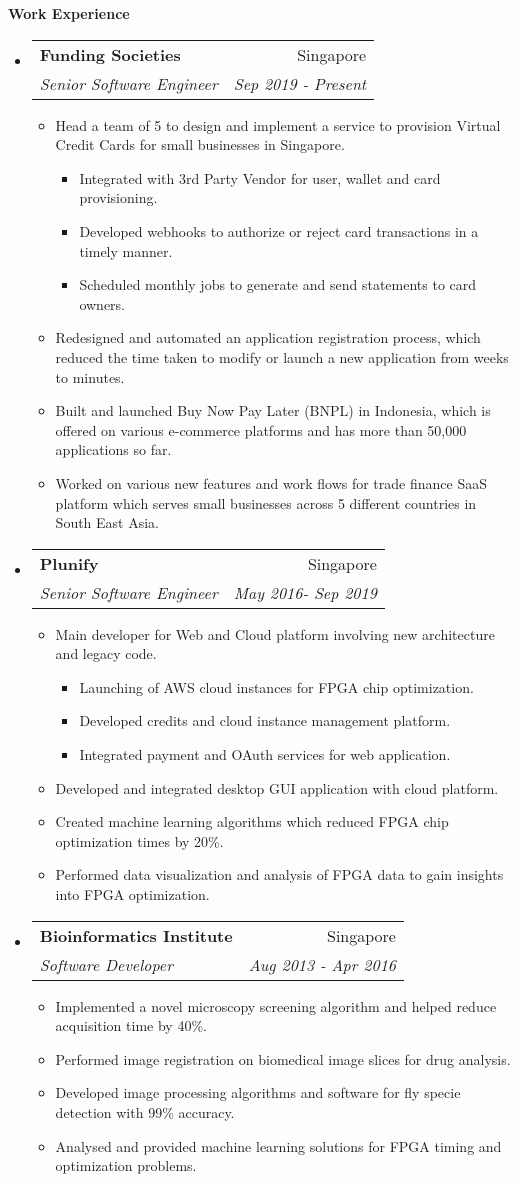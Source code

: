 \documentclass[letterpaper,11pt]{article}
\makeatletter
\newcommand{\resitem}[1]{\item #1 \vspace{-2pt}}
\newcommand{\resheading}[1]{{\large \colorbox{mygrey}{\begin{minipage}{\textwidth}{\textbf{#1 \vphantom{p\^{E}}}}\end{minipage}}}}
\newcommand{\ressubheading}[4]{
\begin{tabular*}{7.0in}{l@{\extracolsep{\fill}}r}
		\textbf{#1} & #2 \\
		\textit{#3} & \textit{#4} \\
\end{tabular*}\vspace{-6pt}}
\makeatother
\begin{document}
\resheading{Work Experience}
\begin{itemize}
\item
	\ressubheading{Funding Societies}{Singapore}{Senior Software Engineer}{Sep 2019 - Present}

	\begin{itemize}
		\resitem{Head a team of 5 to design and implement a service to provision Virtual Credit Cards for small businesses in Singapore.}
		 \begin{itemize}
			\resitem{Integrated with 3rd Party Vendor for user,  wallet and card provisioning.}
			\resitem{Developed webhooks to authorize or reject card transactions in a timely manner.}
			\resitem{Scheduled monthly jobs to generate and send statements to card owners.}
		\end{itemize}
		\resitem{Redesigned and automated an application registration process,  which reduced the time taken to modify or launch a new application from weeks to minutes.}
		\resitem{Built and launched Buy Now Pay Later (BNPL) in Indonesia, which is offered on various e-commerce platforms and has more than 50,000 applications so far.}
		\resitem{Worked on various new features and work flows for trade finance SaaS platform which serves small businesses across 5 different countries in South East Asia.}
	\end{itemize}


\item
	\ressubheading{Plunify}{Singapore}{Senior Software Engineer}{May 2016- Sep 2019}
	\begin{itemize}
	    \resitem{Main developer for Web and Cloud platform involving new architecture and legacy code.}
	    \begin{itemize}
			\resitem{Launching of AWS cloud instances for FPGA chip optimization.}
			\resitem{Developed credits and cloud instance management platform.}
			\resitem{Integrated payment and OAuth services for web application.}
	    \end{itemize}
	    \resitem{Developed and integrated desktop GUI application with cloud platform.}
		\resitem{Created machine learning algorithms which reduced FPGA chip optimization times by 20\%.}
		\resitem{Performed data visualization and analysis of FPGA data to gain insights into FPGA optimization.}
	\end{itemize}


\item
	\ressubheading{Bioinformatics Institute}{Singapore}{Software Developer}{Aug 2013 - Apr 2016}
	\begin{itemize}
		\resitem{Implemented a novel microscopy screening algorithm and helped reduce acquisition time by 40\%.}
		\resitem{Performed image registration on biomedical image slices for drug analysis.}
		\resitem{Developed image processing algorithms and	 software for fly specie detection with 99\% accuracy.}
		\resitem{Analysed and provided machine learning solutions for FPGA timing and optimization problems.}
	\end{itemize}


\end{itemize}
\end{document}
